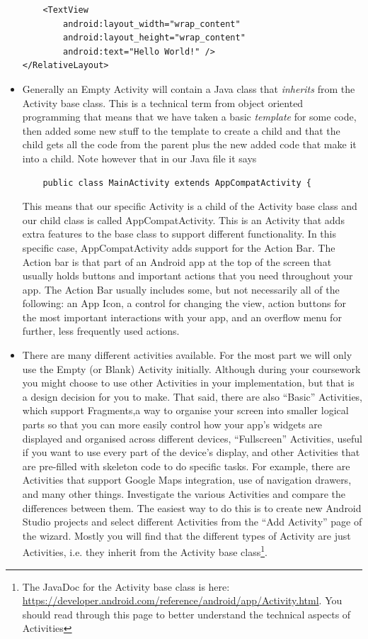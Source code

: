 \begin{itemize}
\begin{lstlisting}
    <TextView
        android:layout_width="wrap_content"
        android:layout_height="wrap_content"
        android:text="Hello World!" />
</RelativeLayout>
\end{lstlisting}



\item Generally an Empty Activity will contain a Java class that \emph{inherits} from the Activity base class. This is a technical term from object oriented programming that means that we have taken a basic \emph{template} for some code, then added some new stuff to the template to create a child and that the child gets all the code from the parent plus the new added code that make it into a child. Note however that in our Java file it says

\begin{lstlisting}
    public class MainActivity extends AppCompatActivity {
\end{lstlisting}

This means that our specific Activity is a child of the Activity base class and our child class is called AppCompatActivity. This is an Activity that adds extra features to the base class to support different functionality. In this specific case, AppCompatActivity adds support for the Action Bar. The Action bar is that part of an Android app at the top of the screen that usually holds buttons and important actions that you need throughout your app. The Action Bar usually includes some, but not necessarily all of the following: an App Icon, a control for changing the view, action buttons for the most important interactions with your app, and an overflow menu for further, less frequently used actions.

\item There are many different activities available. For the most part we will only use the Empty (or Blank) Activity initially. Although during your coursework you might choose to use other Activities in your implementation, but that is a design decision for you to make. That said, there are also ``Basic'' Activities, which support Fragments,a way to organise your screen into smaller logical parts so that you can more easily control how your app's widgets are displayed and organised across different devices, ``Fullscreen'' Activities, useful if you want to use every part of the device's display, and other Activities that are pre-filled with skeleton code to do specific tasks. For example, there are Activities that support Google Maps integration, use of navigation drawers, and many other things. Investigate the various Activities and compare the differences between them. The easiest way to do this is to create new Android Studio projects and select different Activities from the ``Add Activity'' page of the wizard. Mostly you will find that the different types of Activity are just Activities, i.e. they inherit from the Activity base class\footnote{The JavaDoc for the Activity base class is here: \url{https://developer.android.com/reference/android/app/Activity.html}. You should read through this page to better understand the technical aspects of Activities}. 
\end{itemize}



